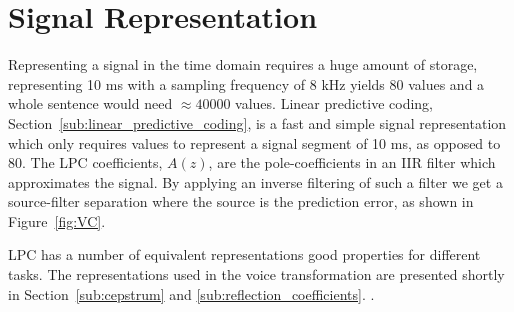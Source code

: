
\section{Signal Representation} %
\label{the:signal_representation}
Representing a signal in the time domain requires a huge amount of storage, \eg representing 10 ms with a sampling frequency of 8 kHz yields 80 values and a whole sentence would need $\approx 40 000$ values. Linear predictive coding, Section~\ref{sub:linear_predictive_coding}, is a fast and simple signal representation which only requires  values to represent a signal segment of 10 ms, as opposed to 80. The LPC coefficients, $A(z)$, are the pole-coefficients in an IIR filter which approximates the signal. By applying an inverse filtering of such a filter we get a source-filter separation where the source is the prediction error, as shown in Figure~\ref{fig:VC}.

LPC has a number of equivalent representations good properties for different tasks. The representations used in the voice transformation are presented shortly in Section~\ref{sub:cepstrum} and \ref{sub:reflection_coefficients}.
.

